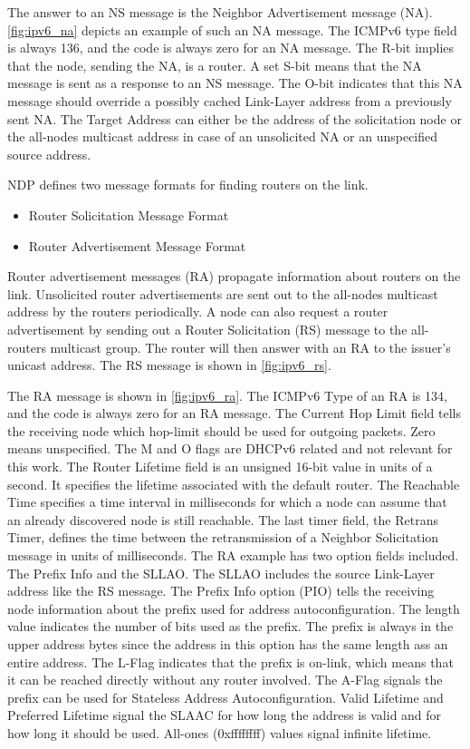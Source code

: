 The answer to an NS message is the Neighbor Advertisement message (NA).
\autoref{fig:ipv6_na} depicts an example of such an NA message.
The ICMPv6 type field is always 136, and the code is always zero for an NA message.
The R-bit implies that the node, sending the NA, is a router.
A set S-bit means that the NA message is sent as a response to an NS message.
The O-bit indicates that this NA message should override a possibly cached Link-Layer address from a previously sent NA.
The Target Address can either be the address of the solicitation node or the all-nodes multicast address in case of an unsolicited NA or an unspecified source address.




NDP defines two message formats for finding routers on the link.
\begin{itemize}
	\item Router Solicitation Message Format
	\item Router Advertisement Message Format
\end{itemize}

Router advertisement messages (RA) propagate information about routers on the link.
Unsolicited router advertisements are sent out to the all-nodes multicast address by the routers periodically.
A node can also request a router advertisement by sending out a Router Solicitation (RS) message to the all-routers multicast group.
The router will then answer with an RA to the issuer's unicast address.
The RS message is shown in \autoref{fig:ipv6_rs}.

The RA message is shown in \autoref{fig:ipv6_ra}.
The ICMPv6 Type of an RA is 134, and the code is always zero for an RA message.
The Current Hop Limit field tells the receiving node which hop-limit should be used for outgoing packets.
Zero means unspecified. The M and O flags are DHCPv6 related and not relevant for this work.
The Router Lifetime field is an unsigned 16-bit value in units of a second. It specifies the lifetime associated with the default router.
The Reachable Time specifies a time interval in milliseconds for which a node can assume that an already discovered node is still reachable.
The last timer field, the Retrans Timer, defines the time between the retransmission of a Neighbor Solicitation message in units of milliseconds.
The RA example has two option fields included. The Prefix Info and the SLLAO.
The SLLAO includes the source Link-Layer address like the RS message.
The Prefix Info option (PIO) tells the receiving node information about the prefix used for address autoconfiguration.
The length value indicates the number of bits used as the prefix. The prefix is always in the upper address bytes since the address
in this option has the same length ass an entire address.
The L-Flag indicates that the prefix is on-link, which means that it can be reached directly without any router involved.
The A-Flag signals the prefix can be used for Stateless Address Autoconfiguration.
Valid Lifetime and Preferred Lifetime signal the SLAAC for how long the address is valid and for how long it should be used.
All-ones (0xffffffff) values signal infinite lifetime.

